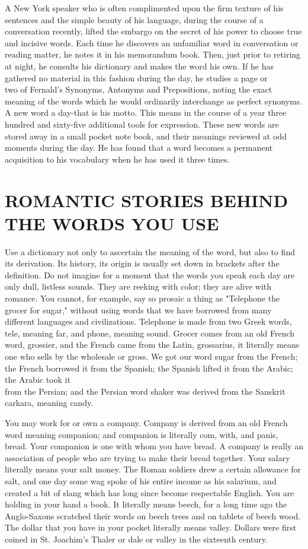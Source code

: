\documentclass[10pt]{article}
\begin{document}
A New York speaker who is often complimented upon the firm texture of his sentences and the simple beauty of his language, during the course of a conversation recently, lifted the embargo on the secret of his power to choose true and incisive words. Each time he discovers an unfamiliar word in conversation or reading matter, he notes it in his memorandum book. Then, just prior to retiring at night, he consults his dictionary and makes the word his own. If he has gathered no material in this fashion during the day, he studies a page or\\
two of Fernald's Synonyms, Antonyms and Prepositions, noting the exact meaning of the words which he would ordinarily interchange as perfect synonyms. A new word a day-that is his motto. This means in the course of a year three hundred and sixty-five additional tools for expression. These new words are stored away in a small pocket note book, and their meanings reviewed at odd moments during the day. He has found that a word becomes a permanent acquisition to his vocabulary when he has used it three times.

\section*{ROMANTIC STORIES BEHIND THE WORDS YOU USE}
Use a dictionary not only to ascertain the meaning of the word, but also to find its derivation. Its history, its origin is usually set down in brackets after the definition. Do not imagine for a moment that the words you speak each day are only dull, listless sounds. They are reeking with color; they are alive with romance. You cannot, for example, say so prosaic a thing as "Telephone the grocer for sugar," without using words that we have borrowed from many different languages and civilizations. Telephone is made from two Greek words, tele, meaning far, and phone, meaning sound. Grocer comes from an old French word, grossier, and the French came from the Latin, grossarius, it literally means one who sells by the wholesale or gross. We got our word sugar from the French; the French borrowed it from the Spanish; the Spanish lifted it from the Arabic; the Arabic took it\\
from the Persian; and the Persian word shaker was derived from the Sanskrit carkara, meaning candy.

You may work for or own a company. Company is derived from an old French word meaning companion; and companion is literally com, with, and panis, bread. Your companion is one with whom you have bread. A company is really an association of people who are trying to make their bread together. Your salary literally means your salt money. The Roman soldiers drew a certain allowance for salt, and one day some wag spoke of his entire income as his salarium, and created a bit of slang which has long since become respectable English. You are holding in your hand a book. It literally means beech, for a long time ago the Anglo-Saxons scratched their words on beech trees and on tablets of beech wood. The dollar that you have in your pocket literally means valley. Dollars were first coined in St. Joachim's Thaler or dale or valley in the sixteenth century.
\end{document}
